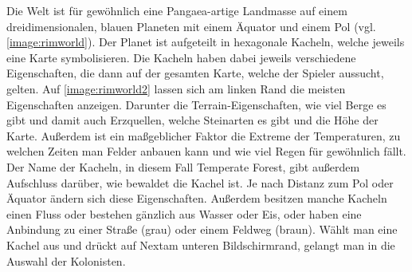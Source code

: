 Die Welt ist für gewöhnlich eine Pangaea-artige Landmasse auf einem dreidimensionalen, blauen Planeten mit einem Äquator und einem Pol (vgl. \autoref{image:rimworld}). Der Planet ist aufgeteilt in hexagonale Kacheln, welche jeweils eine Karte symbolisieren. Die Kacheln haben dabei jeweils verschiedene Eigenschaften, die dann auf der gesamten Karte, welche der Spieler aussucht, gelten. Auf \autoref{image:rimworld2} lassen sich am linken Rand die meisten Eigenschaften anzeigen. Darunter die Terrain-Eigenschaften, wie viel Berge es gibt und damit auch Erzquellen, welche Steinarten es gibt und die Höhe der Karte. Außerdem ist ein maßgeblicher Faktor die Extreme der Temperaturen, zu welchen Zeiten man Felder anbauen kann und wie viel Regen für gewöhnlich fällt. Der Name der Kacheln, in diesem Fall \glqq Temperate Forest\grqq, gibt außerdem Aufschluss darüber, wie bewaldet die Kachel ist. Je nach Distanz zum Pol oder Äquator ändern sich diese Eigenschaften. Außerdem besitzen manche Kacheln einen Fluss oder bestehen gänzlich aus Wasser oder Eis, oder haben eine Anbindung zu einer Straße (grau) oder einem Feldweg (braun). Wählt man eine Kachel aus und drückt auf \glqq Next\grqq am unteren Bildschirmrand, gelangt man in die Auswahl der Kolonisten.

